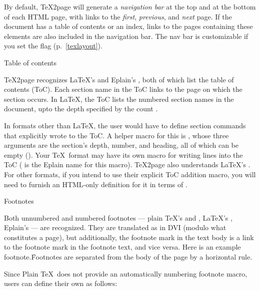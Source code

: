 By default, \TeX2page will generate a {\em navigation
bar} at the top and at the bottom of each HTML page, with
links to the {\em first}, {\em
previous}, and {\em next} page.
If the document has a table of contents or
an index, links to the pages containing these elements are
also included in the
navigation bar.  The nav bar is customizable if you set the
\p{\TZPtexlayout} flag (p.~\ref{texlayout}).

\beginsection Table of contents

%
\TeX2page recognizes \LaTeX's \p{\tableofcontents} and
Eplain's \p{\readtocfile}, both of which list the table
of contents (ToC). Each section name in the ToC links to the
page on which the section occurs.  In \LaTeX, the ToC
lists the numbered section names in the document, upto
the depth specified by the count \p{\tocdepth}.

%
In formats other than \LaTeX, the user would have to
define section commands that explicitly wrote to the
ToC.  A helper macro for this is
\p{\writenumberedtocline}, whose three arguments are
the section's depth, number, and heading, all of which
can be empty (\p{{}}).  Your \TeX\ format may have its
own macro for writing lines into the ToC
(\p{\writenumberedtocline} is the Eplain name for this
macro).  \TeX2page also understands \LaTeX's
\p{\addcontentsline}.  For other formats, if you intend
to use their explicit ToC addition macro, you will need
to furnish an HTML-only definition for it in terms of
\p{\writenumberedtocline}.

\beginsection Footnotes

Both unnumbered and numbered footnotes --- plain \TeX's
\p{\footnote} and \p{\vfootnote},
LaTeX's \p{\footnote}, Eplain's
\p{\numberedfootnote} --- are recognized.
They are translated as in DVI (modulo what constitutes
a page), but additionally, the footnote mark in the text body
is a link to the footnote mark in the footnote text,
and vice versa.  Here is an example
footnote.\f{Footnotes are separated from the body of
the page by a horizontal rule.}

Since Plain \TeX\ does not provide an automatically
numbering footnote macro, users can define their own as
follows:


